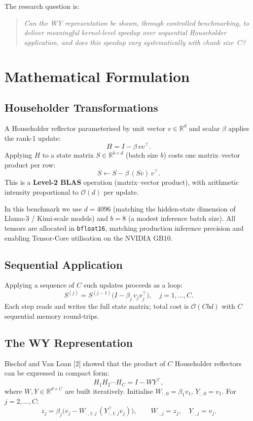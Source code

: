 \documentclass{article} %
\begin{document}
The research question is:
\begin{quote}
\emph{Can the WY representation be shown, through controlled benchmarking, to deliver
meaningful kernel-level speedup over sequential Householder application, and does
this speedup vary systematically with chunk size~$C$?}
\end{quote}

\section{Mathematical Formulation}
\label{sec:theory}

\subsection{Householder Transformations}

A Householder reflector parameterised by unit vector $v \in \mathbb{R}^d$ and
scalar $\beta$ applies the rank-1 update:
\[
  H = I - \beta\, v v^\top.
\]
Applying $H$ to a state matrix $S \in \mathbb{R}^{b \times d}$ (batch size $b$) costs
one matrix--vector product per row:
\[
  S \leftarrow S - \beta\,(S v)\, v^\top.
\]
This is a \textbf{Level-2 BLAS} operation (matrix--vector product), with arithmetic
intensity proportional to $\mathcal{O}(d)$ per update.

In this benchmark we use $d = 4096$ (matching the hidden-state dimension of
Llama-3 / Kimi-scale models) and $b = 8$ (a modest inference batch size).
All tensors are allocated in \texttt{bfloat16}, matching production inference
precision and enabling Tensor-Core utilisation on the NVIDIA GB10.

\subsection{Sequential Application}

Applying a sequence of $C$ such updates proceeds as a loop:
\[
  S^{(j)} = S^{(j-1)}\bigl(I - \beta_j\, v_j v_j^\top\bigr), \quad j = 1, \ldots, C.
\]
Each step reads and writes the full state matrix; total cost is $\mathcal{O}(Cbd)$
with $C$ sequential memory round-trips.

\subsection{The WY Representation}

Bischof and Van Loan [2] showed that the product of $C$ Householder
reflectors can be expressed in compact form:
\[
  H_1 H_2 \cdots H_C = I - W Y^\top,
\]
where $W, Y \in \mathbb{R}^{d \times C}$ are built iteratively.
Initialise $W_{:,0} = \beta_1 v_1$, $Y_{:,0} = v_1$. For $j = 2, \ldots, C$:
\[
  z_j = \beta_j \bigl(v_j - W_{:,1:j}\, (Y_{:,1:j}^\top v_j)\bigr), \qquad
  W_{:,j} = z_j, \quad Y_{:,j} = v_j.
\]
\end{document}
